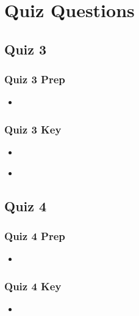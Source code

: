 \chapter{Quiz Questions}

\section{Quiz 3}
\subsection{Quiz 3 Prep}
\begin{itemize}
  \item
\end{itemize}

\subsection{Quiz 3 Key}
\begin{itemize}
  \item
\end{itemize}
\begin{itemize}
  \item
\end{itemize}


\section{Quiz 4}
\subsection{Quiz 4 Prep}
\begin{itemize}
  \item
\end{itemize}

\subsection{Quiz 4 Key}
\begin{itemize}
  \item
\end{itemize}
